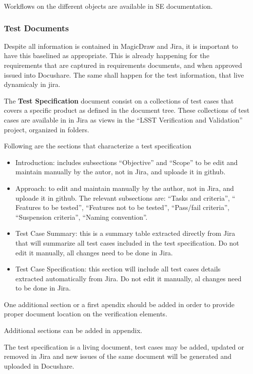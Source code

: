 Workflows on the different objects are available in SE documentation.


\subsubsection{Test Documents}

Despite all information is contained in MagicDraw and Jira, it is important to have this baselined as appropriate. This is already happening for the requirements that are captured in requirements documents, and when approved issued into Docushare.
The same shall happen for the test information, that live dynamicaly in jira.

The {\bf Test Specification} document consist on a collections of test cases that covers a specific \product{} product as defined in the document tree. These collections of test cases are available in in Jira as views in the ``LSST Verification and Validation'' project, organized in folders.

Following are the sections that characterize a test specification

\begin{itemize}
\item Introduction: includes subsections ``Objective'' and ``Scope'' to be edit and maintain manually by the autor, not in Jira, and uploade it in github.
\item Approach: to edit and maintain manually by the author, not in Jira, and uploade it in github. The relevant subsections are: ``Tasks and criteria'', `` Features to be tested'', ``Features not to be tested'', ``Pass/fail criteria'', ``Suspension criteria'', ``Naming convention''.
\item Test Case Summary: this is a summary table extracted directly from Jira that will summarize all test cases included in the test specification. Do not edit it manually, all changes need to be done in Jira.
\item Test Case Specification: this section will include all test cases details extracted automatically from Jira. Do not edit it manually, al changes need to be done in Jira.
\end{itemize}

One additional section or a first apendix should be added in order to provide proper document location on the verification elements.

Additional sections can be added in appendix.

The test specification is a living document, test cases may be added, updated or removed in Jira and new issues of the same document will be generated and uploaded in Docushare.

